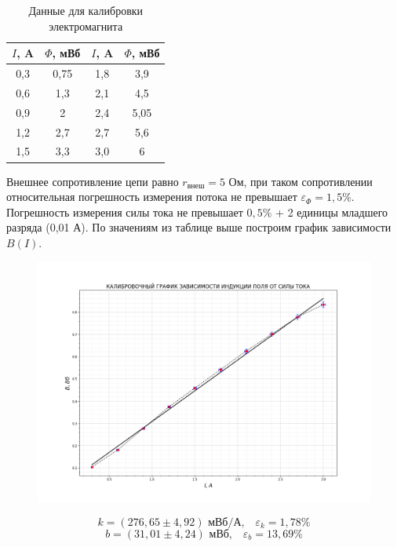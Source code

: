 \documentclass[a4paper,12pt]{article}
\begin{document}
\begin{table}[H]\label{tab: Phi ot I}
    \centering
    \begin{tabular}{|c|c|c|c|}
        \hline
        {\color[HTML]{000000} $I$, A} & {\color[HTML]{000000} $\Phi$, мВб} & {\color[HTML]{000000} $I$, A} & {\color[HTML]{000000} $\Phi$, мВб} \\ \hline
        {\color[HTML]{000000} 0,3} & {\color[HTML]{000000} 0,75} & {\color[HTML]{000000} 1,8} & {\color[HTML]{000000} 3,9}  \\ \hline
        {\color[HTML]{000000} 0,6} & {\color[HTML]{000000} 1,3}  & {\color[HTML]{000000} 2,1} & {\color[HTML]{000000} 4,5}  \\ \hline
        {\color[HTML]{000000} 0,9} & {\color[HTML]{000000} 2}    & {\color[HTML]{000000} 2,4} & {\color[HTML]{000000} 5,05} \\ \hline
        {\color[HTML]{000000} 1,2} & {\color[HTML]{000000} 2,7}  & {\color[HTML]{000000} 2,7} & {\color[HTML]{000000} 5,6}  \\ \hline
        {\color[HTML]{000000} 1,5} & {\color[HTML]{000000} 3,3}  & {\color[HTML]{000000} 3,0} & {\color[HTML]{000000} 6}    \\ \hline
    \end{tabular}
    \caption{Данные для калибровки электромагнита}
\end{table}

Внешнее сопротивление цепи равно $r_{внеш} = 5$ Ом, при таком сопротивлении относительная погрешность измерения потока не превышает $\varepsilon_{\Phi} = 1,5 \%$. Погрешность измерения силы тока не превышает $0,5 \%$ + 2 единицы младшего разряда (0,01 А). По значениям из таблице выше построим график зависимости $B (I)$.

\begin{figure}[H]\label{fig: B(I)}
    \centering
    \includegraphics[width =  1\textwidth]{B(I).png}
\end{figure}
\[k = (276,65 \pm 4,92) \text{ мВб/А,} \quad \varepsilon_{k} = 1,78 \%\]
\[b = (31,01 \pm 4,24) \text{ мВб,} \quad \varepsilon_{b} = 13,69 \%\]
\end{document}
